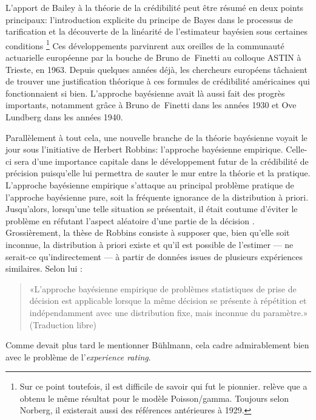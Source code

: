 L'apport de Bailey à la théorie de la crédibilité peut être résumé en
deux points principaux: l'introduction explicite du principe de Bayes
dans le processus de tarification et la découverte de la linéarité de
l'estimateur bayésien sous certaines conditions%
\footnote{Sur ce point toutefois, il est difficile de savoir qui fut
  le pionnier. \cite{Norberg:credibility:1979} relève que
  \cite{Keffer:1929} a obtenu le même résultat pour le modèle
  Poisson/gamma. Toujours selon Norberg, il existerait aussi des
  références antérieures à 1929.} %
Ces développements parvinrent aux oreilles de la communauté
actuarielle européenne par la bouche de Bruno de~Finetti au colloque
ASTIN à Trieste, en 1963. Depuis quelques années déjà, les
chercheurs européens tâchaient de trouver une justification théorique
à ces formules de crédibilité américaines qui fonctionnaient si bien.
L'approche bayésienne avait là aussi fait des progrès importants,
notamment grâce à Bruno de~Finetti dans les années 1930 et Ove Lundberg
dans les années 1940.

Parallèlement à tout cela, une nouvelle branche de la théorie
bayésienne voyait le jour sous l'initiative de Herbert Robbins:
l'approche bayésienne empirique. Celle-ci sera d'une importance
capitale dans le développement futur de la crédibilité de précision
puisqu'elle lui permettra de sauter le mur entre la théorie et la
pratique. L'approche bayésienne empirique
\citep{Robbins:empiricalbayes:1955,Robbins:empiricalbayes:1964}
s'attaque au principal problème pratique de l'approche bayésienne
pure, soit la fréquente ignorance de la distribution à priori.
Jusqu'alors, lorsqu'une telle situation se présentait, il était
coutume d'éviter le problème en réfutant l'aspect aléatoire d'une
partie de la décision \citep{Neyman:1962}. Grossièrement, la thèse de
Robbins consiste à supposer que, bien qu'elle soit inconnue, la
distribution à priori existe et qu'il est possible de l'estimer --- ne
serait-ce qu'indirectement --- à partir de données issues de plusieurs
expériences similaires. Selon lui \citep{Robbins:empiricalbayes:1964}:
\begin{quote}
  «L'approche bayésienne empirique de problèmes statistiques de prise
  de décision est applicable lorsque la même décision se présente à
  répétition et indépendamment avec une distribution fixe, mais
  inconnue du paramètre.» (Traduction libre)
\end{quote}

Comme devait plus tard le mentionner Bühlmann, cela cadre
admirablement bien avec le problème de l'\emph{experience rating}.

